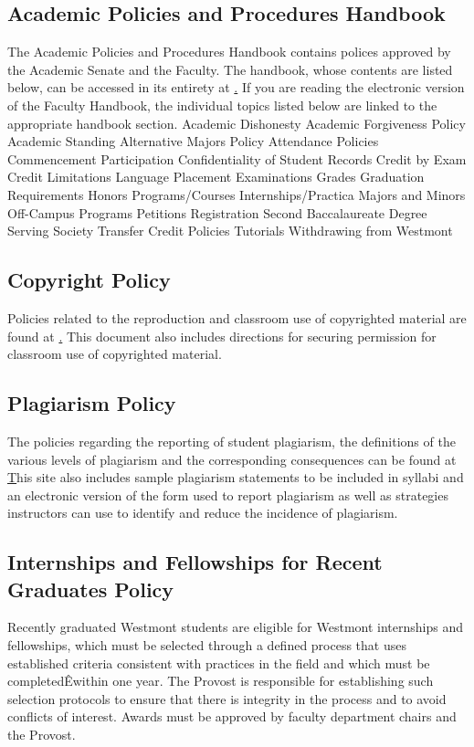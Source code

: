 \documentclass[letterpaper, 11pt]{article}
\begin{document}
	\subsection{Academic Policies and Procedures Handbook}
		The Academic Policies and Procedures Handbook contains polices approved by
		the Academic Senate and the Faculty.  The handbook, whose contents are listed
		below, can be accessed in its entirety at
		\href{http://cgi2.westmont.edu/publications/academic_policies/} .
		If you are reading the electronic version of the Faculty Handbook, the individual topics listed below are linked to the appropriate handbook section.
		Academic Dishonesty
		Academic Forgiveness Policy
		Academic Standing
		Alternative Majors Policy
		Attendance Policies
		Commencement Participation
		Confidentiality of Student Records
		Credit by Exam
		Credit Limitations
		Language Placement
		Examinations
		Grades
		Graduation Requirements
		Honors Programs/Courses
		Internships/Practica
		Majors and Minors
		Off-Campus Programs
		Petitions
		Registration
		Second Baccalaureate Degree
		Serving Society
		Transfer Credit Policies
		Tutorials
		Withdrawing from Westmont
	\subsection{Copyright Policy}
		Policies related to the reproduction and classroom use of copyrighted
		material are found at
		\href{http://www.westmont.edu/_faculty_staff/pages/policies/copyright_policy/index.html}.
		This document also includes directions for securing permission for classroom use of copyrighted material.
	\subsection{Plagiarism Policy}
		The policies regarding the reporting of student plagiarism, the definitions
		of the various levels of plagiarism and the corresponding consequences can be
		found at
		\href{http://www.westmont.edu/_academics/pages/provost/curriculum/plagiarism/}
		This site also includes sample plagiarism statements to be included in syllabi and an electronic version of the form used to report plagiarism as well as strategies instructors can use to identify and reduce the incidence of plagiarism.
	\subsection{Internships and Fellowships for Recent Graduates Policy}
		Recently graduated Westmont students are eligible for Westmont internships and fellowships, which must be selected through a defined process that uses established criteria consistent with practices in the field and which must be completedÊwithin one year. The Provost is responsible for establishing such selection protocols to ensure that there is integrity in the process and to avoid conflicts of interest. Awards must be approved by faculty department chairs and the Provost.
\end{document}
